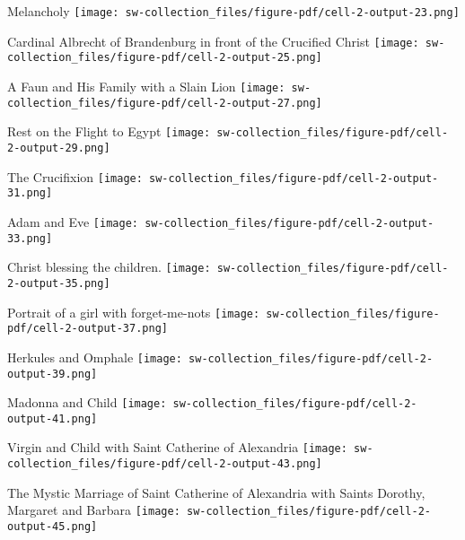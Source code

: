 \documentclass[
  letterpaper,
]{book}
\begin{document}
Melancholy
\texttt{[image: sw-collection\_files/figure-pdf/cell-2-output-23.png]}

Cardinal Albrecht of Brandenburg in front of the Crucified Christ
\texttt{[image: sw-collection\_files/figure-pdf/cell-2-output-25.png]}

A Faun and His Family with a Slain Lion
\texttt{[image: sw-collection\_files/figure-pdf/cell-2-output-27.png]}

Rest on the Flight to Egypt
\texttt{[image: sw-collection\_files/figure-pdf/cell-2-output-29.png]}

The Crucifixion
\texttt{[image: sw-collection\_files/figure-pdf/cell-2-output-31.png]}

Adam and Eve
\texttt{[image: sw-collection\_files/figure-pdf/cell-2-output-33.png]}

Christ blessing the children.
\texttt{[image: sw-collection\_files/figure-pdf/cell-2-output-35.png]}

Portrait of a girl with forget-me-nots
\texttt{[image: sw-collection\_files/figure-pdf/cell-2-output-37.png]}

Herkules and Omphale
\texttt{[image: sw-collection\_files/figure-pdf/cell-2-output-39.png]}

Madonna and Child
\texttt{[image: sw-collection\_files/figure-pdf/cell-2-output-41.png]}

Virgin and Child with Saint Catherine of Alexandria
\texttt{[image: sw-collection\_files/figure-pdf/cell-2-output-43.png]}

The Mystic Marriage of Saint Catherine of Alexandria with Saints
Dorothy, Margaret and Barbara
\texttt{[image: sw-collection\_files/figure-pdf/cell-2-output-45.png]}


\backmatter
\end{document}
